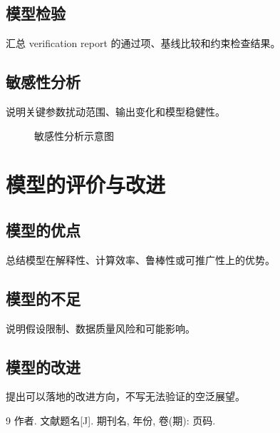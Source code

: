 \documentclass[UTF8,a4paper,12pt]{ctexart}
\begin{document}
\subsection{模型检验}
汇总 verification report 的通过项、基线比较和约束检查结果。

\subsection{敏感性分析}
说明关键参数扰动范围、输出变化和模型稳健性。

\begin{figure}[H]
  \centering
  \caption{敏感性分析示意图}
  \label{fig:sensitivity}
\end{figure}

\section{模型的评价与改进}
\subsection{模型的优点}
总结模型在解释性、计算效率、鲁棒性或可推广性上的优势。

\subsection{模型的不足}
说明假设限制、数据质量风险和可能影响。

\subsection{模型的改进}
提出可以落地的改进方向，不写无法验证的空泛展望。

\begin{thebibliography}{9}
作者. 文献题名[J]. 期刊名, 年份, 卷(期): 页码.
\end{thebibliography}
\end{document}
